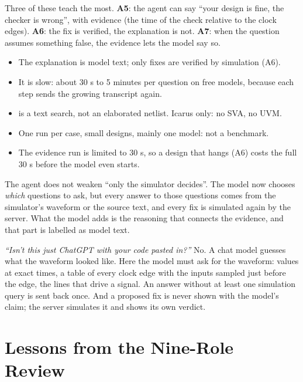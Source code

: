 Three of these teach the most. \textbf{A5}: the agent can say ``your design is fine, the checker is wrong'', with evidence (the time of the check relative to the clock edges). \textbf{A6}: the fix is verified, the explanation is not. \textbf{A7}: when the question assumes something false, the evidence lets the model say so.

\begin{warnbox}[Limitations]
\begin{itemize}
  \item The explanation is model text; only fixes are verified by simulation (A6).
  \item It is slow: about 30 s to 5 minutes per question on free models, because each step sends the growing transcript again.
  \item {} is a text search, not an elaborated netlist. Icarus only: no SVA, no UVM.
  \item One run per case, small designs, mainly one model: not a benchmark.
  \item The evidence run is limited to 30 s, so a design that hangs (A6) costs the full 30 s before the model even starts.
\end{itemize}
\end{warnbox}

\begin{keyidea}
The agent does not weaken ``only the simulator decides''. The model now chooses \emph{which} questions to ask, but every answer to those questions comes from the simulator's waveform or the source text, and every fix is simulated again by the server. What the model adds is the reasoning that connects the evidence, and that part is labelled as model text.
\end{keyidea}

\begin{viva}
\emph{``Isn't this just ChatGPT with your code pasted in?''} No. A chat model guesses what the waveform looked like. Here the model must ask for the waveform: values at exact times, a table of every clock edge with the inputs sampled just before the edge, the lines that drive a signal. An answer without at least one simulation query is sent back once. And a proposed fix is never shown with the model's claim; the server simulates it and shows its own verdict.
\end{viva}

\chapter{Lessons from the Nine-Role Review}
\label{ch:review}

